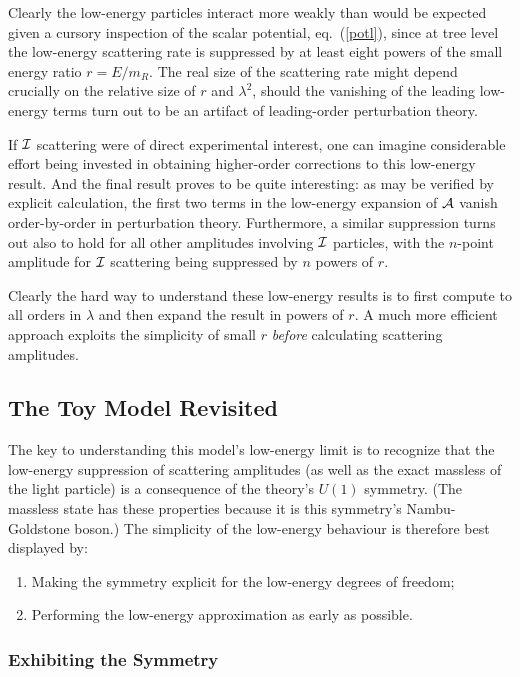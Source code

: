 \documentclass[12pt]{JHEP3}
\begin{document}
Clearly the low-energy particles interact more weakly than would
be expected given a cursory inspection of the scalar potential,
eq.~(\ref{potl}), since at tree level the low-energy scattering
rate is suppressed by at least eight powers of the small energy
ratio $r = E/m_{\scriptscriptstyle R}$. The real size of the
scattering rate might depend crucially on the relative size of $r$
and $\lambda^2$, should the vanishing of the leading low-energy
terms turn out to be an artifact of leading-order perturbation
theory.

If ${\cal I}$ scattering were of direct experimental interest, one
can imagine considerable effort being invested in obtaining
higher-order corrections to this low-energy result. And the final
result proves to be quite interesting: as may be verified by
explicit calculation, the first two terms in the low-energy
expansion of ${\cal A}$ vanish order-by-order in perturbation
theory. Furthermore, a similar suppression turns out also to hold
for all other amplitudes involving ${\cal I}$ particles, with the
$n$-point amplitude for ${\cal I}$ scattering being suppressed by
$n$ powers of $r$.

Clearly the hard way to understand these low-energy results is to
first compute to all orders in $\lambda$ and then expand the
result in powers of $r$. A much more efficient approach exploits
the simplicity of small $r$ {\sl before} calculating scattering
amplitudes.

\subsection{The Toy Model Revisited}
%
The key to understanding this model's low-energy limit is to
recognize that the low-energy suppression of scattering amplitudes
(as well as the exact massless of the light particle) is a
consequence of the theory's $U(1)$ symmetry. (The massless state
has these properties because it is this symmetry's Nambu-Goldstone
boson.\cite{ChiPT,physica,GBreviews,Burgess00}) The simplicity of
the low-energy behaviour is therefore best displayed by:

\begin{enumerate}
\item
Making the symmetry explicit for the low-energy degrees of
freedom;
%
\item
Performing the low-energy approximation as early as possible.
%
\end{enumerate}

\subsubsection{Exhibiting the Symmetry}
\end{document}
